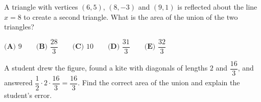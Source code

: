 A triangle with vertices $(6,5)$, $(8,-3)$ and $(9,1)$ is reflected about the line $x=8$ to create a second triangle. What is the area of the union of the two triangles?

$\textbf{(A) }9\qquad\textbf{(B) }\dfrac{28}{3}\qquad\textbf{(C) }10\qquad\textbf{(D) }\dfrac{31}{3}\qquad\textbf{(E) }\dfrac{32}{3}$

A student drew the figure, found a kite with diagonals of lengths $2$ and $\dfrac{16}{3}$, and answered $\dfrac{1}{2}\cdot2\cdot\dfrac{16}{3}=\dfrac{16}{3}$. Find the correct area of the union and explain the student's error.
